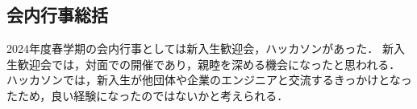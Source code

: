 \subsection*{会内行事総括}


2024年度春学期の会内行事としては新入生歓迎会，ハッカソンがあった．
新入生歓迎会では，対面での開催であり，親睦を深める機会になったと思われる．
ハッカソンでは，新入生が他団体や企業のエンジニアと交流するきっかけとなったため，良い経験になったのではないかと考えられる．

